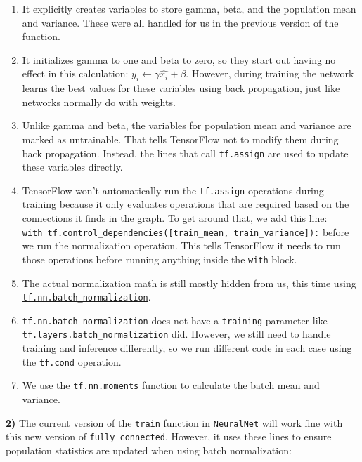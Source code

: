 \documentclass[11pt]{article}
\providecommand{\tightlist}{%
      \setlength{\itemsep}{0pt}\setlength{\parskip}{0pt}}
\begin{document}
\begin{enumerate}
\def\labelenumi{\arabic{enumi}.}
\tightlist
\item
  It explicitly creates variables to store gamma, beta, and the
  population mean and variance. These were all handled for us in the
  previous version of the function.
\item
  It initializes gamma to one and beta to zero, so they start out having
  no effect in this calculation:
  \(y_i \leftarrow \gamma \hat{x_i} + \beta\). However, during training
  the network learns the best values for these variables using back
  propagation, just like networks normally do with weights.
\item
  Unlike gamma and beta, the variables for population mean and variance
  are marked as untrainable. That tells TensorFlow not to modify them
  during back propagation. Instead, the lines that call
  \texttt{tf.assign} are used to update these variables directly.
\item
  TensorFlow won't automatically run the \texttt{tf.assign} operations
  during training because it only evaluates operations that are required
  based on the connections it finds in the graph. To get around that, we
  add this line:
  \texttt{with\ tf.control\_dependencies({[}train\_mean,\ train\_variance{]}):}
  before we run the normalization operation. This tells TensorFlow it
  needs to run those operations before running anything inside the
  \texttt{with} block.
\item
  The actual normalization math is still mostly hidden from us, this
  time using
  \href{https://www.tensorflow.org/api_docs/python/tf/nn/batch_normalization}{\texttt{tf.nn.batch\_normalization}}.
\item
  \texttt{tf.nn.batch\_normalization} does not have a \texttt{training}
  parameter like \texttt{tf.layers.batch\_normalization} did. However,
  we still need to handle training and inference differently, so we run
  different code in each case using the
  \href{https://www.tensorflow.org/api_docs/python/tf/cond}{\texttt{tf.cond}}
  operation.
\item
  We use the
  \href{https://www.tensorflow.org/api_docs/python/tf/nn/moments}{\texttt{tf.nn.moments}}
  function to calculate the batch mean and variance.
\end{enumerate}

    \textbf{2)} The current version of the \texttt{train} function in
\texttt{NeuralNet} will work fine with this new version of
\texttt{fully\_connected}. However, it uses these lines to ensure
population statistics are updated when using batch normalization:
\end{document}
